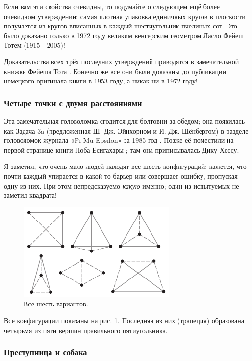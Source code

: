 Если вам эти свойства очевидны, то подумайте о следующем ещё более очевидном утверждении: самая плотная упаковка единичных кругов в плоскости получается из кругов вписанных в каждый шестиугольник пчелиных сот.
Это было доказано только в 1972 году великим венгерским геометром Ласло Фейеш Тотем (1915---2005)!

\begin{addedbytheeditors}
Доказательства всех трёх последних утверждений приводятся в замечательной книжке Фейеша Тота \cite[III §3]{tot}.
Конечно же все они были доказаны до публикации немецкого оригинала книги в 1953 году, а никак ни в 1972 году!
\end{addedbytheeditors}

\subsubsection*{Четыре точки с двумя расстояниями}

Эта замечательная головоломка сгодится для болтовни за обедом;
она появилась как Задача 3a (предложенная Ш. Дж. Эйнхорном и И. Дж. Шёнбергом) в разделе головоломок журнала «Pi Mu Epsilon» за 1985 год \cite{16}.
Позже её поместили на первой странице книги Ноба Ёсигахары \cite{61};
там она приписывалась Дику Хессу.

Я заметил, что очень мало людей находят все шесть конфигураций;
кажется, что почти каждый упирается в какой-то барьер или совершает ошибку, пропуская одну из них.
При этом непредсказуемо \emph{какую} именно; один из испытуемых не заметил квадрата!

\begin{figure}[h!]
\centering
\includegraphics[scale=1]{pics/2dist}
\caption{Все шесть вариантов.}
\label{pic:2dist}
\end{figure}

Все конфигурации показаны на рис. \ref{pic:2dist}.
Последняя из них (трапеция) образована четырьмя из пяти вершин правильного пятиугольника.


\subsubsection*{Преступница и собака}

